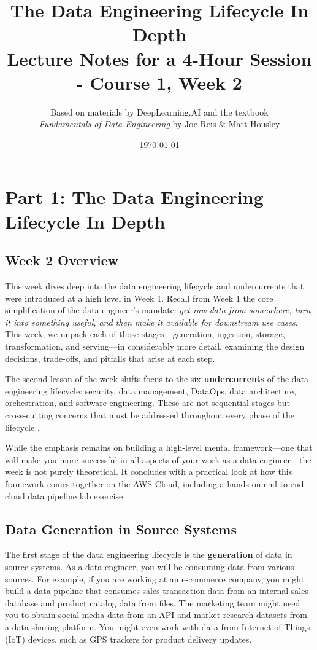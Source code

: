 \documentclass{article}
\title{The Data Engineering Lifecycle In Depth \\ \large{Lecture Notes for a 4-Hour Session - Course 1, Week 2}}
\author{Based on materials by DeepLearning.AI and the textbook \\ \textit{Fundamentals of Data Engineering} by Joe Reis \& Matt Housley \cite{reis2022fundamentals}}
\date{\today}
\begin{document}
\maketitle
\tableofcontents
\newpage


\section{Part 1: The Data Engineering Lifecycle In Depth}

\subsection{Week 2 Overview}
This week dives deep into the data engineering lifecycle and undercurrents that were introduced at a high level in Week 1. Recall from Week 1 the core simplification of the data engineer's mandate: \textit{get raw data from somewhere, turn it into something useful, and then make it available for downstream use cases}. This week, we unpack each of those stages---generation, ingestion, storage, transformation, and serving---in considerably more detail, examining the design decisions, trade-offs, and pitfalls that arise at each step.

The second lesson of the week shifts focus to the six \textbf{undercurrents} of the data engineering lifecycle: security, data management, DataOps, data architecture, orchestration, and software engineering. These are not sequential stages but cross-cutting concerns that must be addressed throughout every phase of the lifecycle \cite{reis2022fundamentals}.

While the emphasis remains on building a high-level mental framework---one that will make you more successful in all aspects of your work as a data engineer---the week is not purely theoretical. It concludes with a practical look at how this framework comes together on the AWS Cloud, including a hands-on end-to-end cloud data pipeline lab exercise.

\subsection{Data Generation in Source Systems}
The first stage of the data engineering lifecycle is the \textbf{generation} of data in source systems. As a data engineer, you will be consuming data from various sources. For example, if you are working at an e-commerce company, you might build a data pipeline that consumes sales transaction data from an internal sales database and product catalog data from files. The marketing team might need you to obtain social media data from an API and market research datasets from a data sharing platform. You might even work with data from Internet of Things (IoT) devices, such as GPS trackers for product delivery updates.
\end{document}
